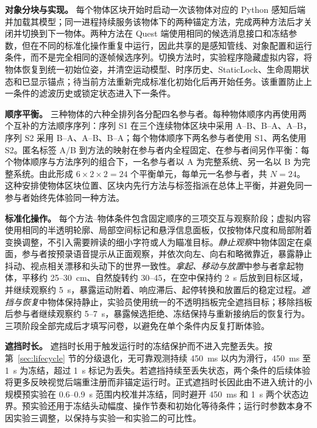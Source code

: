 \documentclass[review]{vgtc}
\begin{document}
\textbf{对象分块与实现。} 每个物体区块开始时启动一次该物体对应的 Python 感知后端并加载其模型；同一进程持续服务该物体下的两种锚定方法，完成两种方法后才关闭并切换到下一物体。两种方法在 Quest 端使用相同的候选消息接口和冻结参数，但在不同的标准化操作重复中运行，因此共享的是感知管线、对象配置和运行条件，而不是完全相同的逐帧候选序列。切换方法时，实验程序隐藏虚拟内容，将物体恢复到统一初始位姿，并清空运动模型、时序历史、StaticLock、生命周期状态和已显示锚点；待当前方法重新完成标准化初始化后再开始任务。该重置防止上一条件的滤波历史或锁定状态进入下一条件。

\textbf{顺序平衡。} 三种物体的六种全排列各分配四名参与者。每种物体顺序内再使用两个互补的方法顺序序列：序列 S1 在三个连续物体区块中采用 A--B、B--A、A--B，序列 S2 采用 B--A、A--B、B--A；每个物体顺序下两名参与者使用 S1、两名使用 S2。匿名标签 A/B 到方法的映射在参与者内全程固定、在参与者间另作平衡：每个物体顺序与方法序列的组合下，一名参与者以 A 为完整系统、另一名以 B 为完整系统。由此形成 $6 \times 2 \times 2=24$ 个平衡单元，每单元一名参与者，共 $N=24$。这种安排使物体区块位置、区块内先行方法与标签指派在总体上平衡，并避免同一参与者始终先体验同一种方法。

\textbf{标准化操作。} 每个方法--物体条件包含固定顺序的三项交互与观察阶段；虚拟内容使用相同的半透明轮廓、局部空间标记和悬浮信息面板，仅按物体尺度和局部附着变换调整，不引入需要辨读的细小字符或人为瞄准目标。\emph{静止观察}中物体固定在桌面，参与者按预录语音提示从正面观察，并依次向左、向右和略微靠近，暴露静止抖动、视点相关漂移和头动下的世界一致性。\emph{拿起、移动与放置}中参与者拿起物体，平移约 25--30~cm、自然旋转约 30--45\textdegree{}，在空中保持约 2~s 后放到目标区域，并继续观察约 5~s，暴露运动附着、响应滞后、起停转换和放置后的稳定过程。\emph{遮挡与恢复}中物体保持静止，实验员使用统一的不透明挡板完全遮挡目标；移除挡板后参与者继续观察约 5--7~s，暴露候选拒绝、冻结保持与重新接纳后的恢复行为。三项阶段全部完成后才填写问卷，以避免在单个条件内反复打断体验。

\textbf{遮挡时长。} 遮挡时长用于触发运行时的冻结保护而不进入完整丢失。按第~\ref{sec:lifecycle} 节的分级退化，无可靠观测持续 450~ms 以内为滑行，450~ms 至 1~s 为冻结，超过 1~s 标记为丢失。若遮挡持续至丢失状态，两个条件的后续体验将更多反映视觉后端重注册而非锚定运行时。正式遮挡时长因此由不进入统计的小规模预实验在 0.6--0.9~s 范围内校准并冻结，同时避开 450~ms 和 1~s 两个状态边界。预实验还用于冻结头动幅度、操作节奏和初始化等待条件；运行时参数本身不因实验三调整，以保持与实验一和实验二的可比性。
\end{document}
